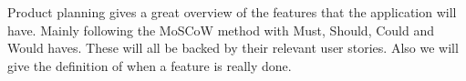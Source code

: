Product planning gives a great overview of the features that the application will have. Mainly following the MoSCoW method with Must, Should, Could and Would haves. These will all be backed by their relevant user stories. Also we will give the definition of when a feature is really done.